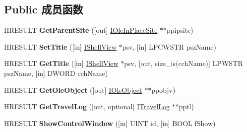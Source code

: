 \subsection*{Public 成员函数}
\begin{DoxyCompactItemize}
\item 
\mbox{\label{interface_i_browser_service_aae1c273e60e08f991d2305965bf4557a}} 
H\+R\+E\+S\+U\+LT {\bfseries Get\+Parent\+Site} (\mbox{[}out\mbox{]} \hyperlink{interface_i_ole_in_place_site}{I\+Ole\+In\+Place\+Site} $\ast$$\ast$ppipsite)
\item 
\mbox{\label{interface_i_browser_service_abefeb04d2e8d2495c62af0c4c531c58a}} 
H\+R\+E\+S\+U\+LT {\bfseries Set\+Title} (\mbox{[}in\mbox{]} \hyperlink{interface_i_shell_view}{I\+Shell\+View} $\ast$psv, \mbox{[}in\mbox{]} L\+P\+C\+W\+S\+TR psz\+Name)
\item 
\mbox{\label{interface_i_browser_service_a345b19d0d9228937fee0e00b40854f9c}} 
H\+R\+E\+S\+U\+LT {\bfseries Get\+Title} (\mbox{[}in\mbox{]} \hyperlink{interface_i_shell_view}{I\+Shell\+View} $\ast$psv, \mbox{[}out, size\+\_\+is(cch\+Name)\mbox{]} L\+P\+W\+S\+TR psz\+Name, \mbox{[}in\mbox{]} D\+W\+O\+RD cch\+Name)
\item 
\mbox{\label{interface_i_browser_service_a6726d23057753dc3b82d149f4c98bf98}} 
H\+R\+E\+S\+U\+LT {\bfseries Get\+Ole\+Object} (\mbox{[}out\mbox{]} \hyperlink{interface_i_ole_object}{I\+Ole\+Object} $\ast$$\ast$ppobjv)
\item 
\mbox{\label{interface_i_browser_service_aa32cce98ffb284e1a4968d5869e119d5}} 
H\+R\+E\+S\+U\+LT {\bfseries Get\+Travel\+Log} (\mbox{[}out, optional\mbox{]} \hyperlink{interface_i_travel_log}{I\+Travel\+Log} $\ast$$\ast$pptl)
\item 
\mbox{\label{interface_i_browser_service_ac88cb27992bae566577e33c2db7783df}} 
H\+R\+E\+S\+U\+LT {\bfseries Show\+Control\+Window} (\mbox{[}in\mbox{]} U\+I\+NT id, \mbox{[}in\mbox{]} B\+O\+OL f\+Show)
\item 
\mbox{\label{interface_i_browser_service_a6a77841f02f392c34a30865dc96f81d2}} 
$$
\end{DoxyCompactItemize}
